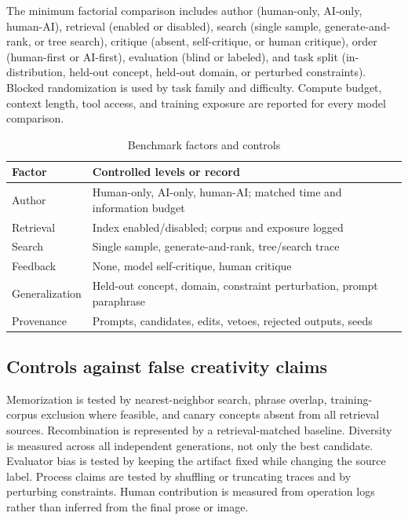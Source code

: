 \documentclass[conference]{IEEEtran}
\begin{document}
The minimum factorial comparison includes author (human-only, AI-only, human-AI),
retrieval (enabled or disabled), search (single sample, generate-and-rank, or tree
search), critique (absent, self-critique, or human critique), order (human-first or
AI-first), evaluation (blind or labeled), and task split (in-distribution, held-out
concept, held-out domain, or perturbed constraints). Blocked randomization is used by
task family and difficulty. Compute budget, context length, tool access, and training
exposure are reported for every model comparison.

\begin{table}[t]
\caption{Benchmark factors and controls}
\label{tab:factors}
\centering
\footnotesize
\begin{tabular}{p{}p{}}
\hline
Factor & Controlled levels or record \\
\hline
Author & Human-only, AI-only, human-AI; matched time and information budget \\
Retrieval & Index enabled/disabled; corpus and exposure logged \\
Search & Single sample, generate-and-rank, tree/search trace \\
Feedback & None, model self-critique, human critique \\
Generalization & Held-out concept, domain, constraint perturbation, prompt paraphrase \\
Provenance & Prompts, candidates, edits, vetoes, rejected outputs, seeds \\
\hline
\end{tabular}
\end{table}

\subsection{Controls against false creativity claims}

Memorization is tested by nearest-neighbor search, phrase overlap, training-corpus
exclusion where feasible, and canary concepts absent from all retrieval sources.
Recombination is represented by a retrieval-matched baseline. Diversity is measured
across all independent generations, not only the best candidate. Evaluator bias is
tested by keeping the artifact fixed while changing the source label. Process claims are
tested by shuffling or truncating traces and by perturbing constraints. Human
contribution is measured from operation logs rather than inferred from the final prose
or image.
\end{document}
